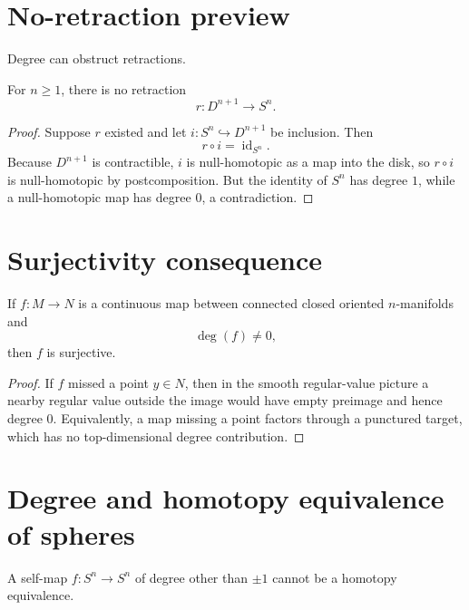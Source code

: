 \section{No-retraction preview}

Degree can obstruct retractions.

\begin{theorem}
\label{thm:viii03-no-retraction}
For \(n\ge1\), there is no retraction
\[
r:D^{n+1}\to S^n.
\]
\end{theorem}

\begin{proof}
Suppose \(r\) existed and let \(i:S^n\hookrightarrow D^{n+1}\) be inclusion.
Then
\[
r\circ i=\operatorname{id}_{S^n}.
\]
Because \(D^{n+1}\) is contractible, \(i\) is null-homotopic as a map into the
disk, so \(r\circ i\) is null-homotopic by postcomposition.  But the identity
of \(S^n\) has degree \(1\), while a null-homotopic map has degree \(0\), a
contradiction.
\end{proof}

\section{Surjectivity consequence}

\begin{proposition}
\label{prop:viii03-surjective}
If \(f:M\to N\) is a continuous map between connected closed oriented
\(n\)-manifolds and
\[
\deg(f)\ne0,
\]
then \(f\) is surjective.
\end{proposition}

\begin{proof}
If \(f\) missed a point \(y\in N\), then in the smooth regular-value picture a
nearby regular value outside the image would have empty preimage and hence
degree \(0\).  Equivalently, a map missing a point factors through a punctured
target, which has no top-dimensional degree contribution.
\end{proof}

\section{Degree and homotopy equivalence of spheres}

\begin{corollary}
A self-map \(f:S^n\to S^n\) of degree other than \(\pm1\) cannot be a homotopy
equivalence.
\end{corollary}

